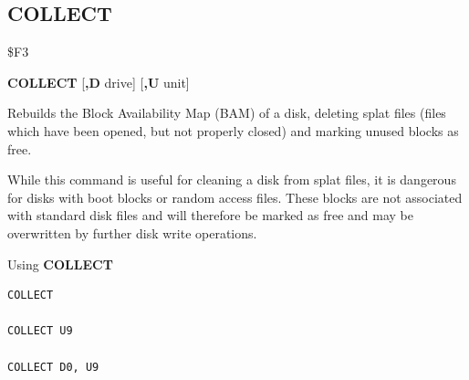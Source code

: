 \subsection{COLLECT}
\begin{description}[leftmargin=2cm,style=nextline]
\item [Token:]    \$F3

\item [Format:]   {\bf COLLECT} [{\bf,D} drive] [{\bf,U} unit]

\item [Usage:]    Rebuilds the Block Availability Map (BAM) of a disk, deleting splat files (files which have been opened, but not properly closed) and marking unused blocks as free.

                  \drivedefinition

                  \unitdefinition

\item [Remarks:]  While this command is useful for cleaning a disk from splat files, it is dangerous for disks with boot blocks or random access files. These blocks are not associated with standard disk files and will therefore be marked as free and may be overwritten by further disk write operations.

\item [Examples:] Using {\bf COLLECT}

\begin{tcolorbox}[colback=black,coltext=white]
\verbatimfont{\codefont}
\begin{verbatim}
COLLECT

COLLECT U9

COLLECT D0, U9
\end{verbatim}
\end{tcolorbox}
\end{description}


\newpage
